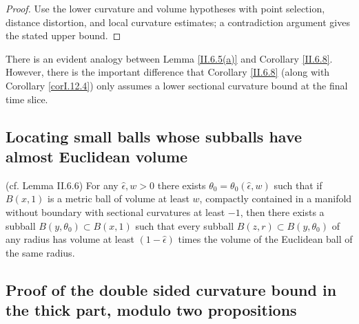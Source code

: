 \begin{proof}
\sketch Use the lower curvature and volume hypotheses with point selection, distance distortion, and local curvature estimates; a contradiction argument gives the stated upper bound.
\end{proof}

There is an evident analogy between Lemma \ref{II.6.5(a)} and
Corollary \ref{II.6.8}. However, there is the important difference that
Corollary \ref{II.6.8} (along with Corollary \ref{corI.12.4}) only
assumes a lower sectional curvature bound at the final time slice.

\subsection{Locating small balls whose subballs have almost Euclidean volume}

\begin{lemma}
  \label{lem:kl-locating-small-balls-whose-subballs-almost-euclidean-volume-existence-sectional-curvature}
 \label{Alexlemma2} (cf. Lemma II.6.6)
For any $\widehat{\epsilon}, w>0$
there exists $\theta_0 = \theta_0(\widehat{\epsilon},w)$
such that if $B(x,1)$ is a metric ball of volume at least $w$, compactly
contained in a manifold without boundary with sectional
curvatures at least $-1$, then there exists a subball
$B(y,\theta_0) \subset B(x,1)$ such that every subball
$B(z,r) \subset B(y,\theta_0)$ of any radius has volume at
least $(1-\widehat{\epsilon})$ times the volume of the Euclidean ball
of the same radius.
\end{lemma}

\begin{remark}
\label{rem:kl-locating-small-balls-whose-subballs-almost-euclidean-volume-existence-volume}


\end{remark}

\subsection{Proof of the double sided curvature bound in the thick part, modulo two propositions}

